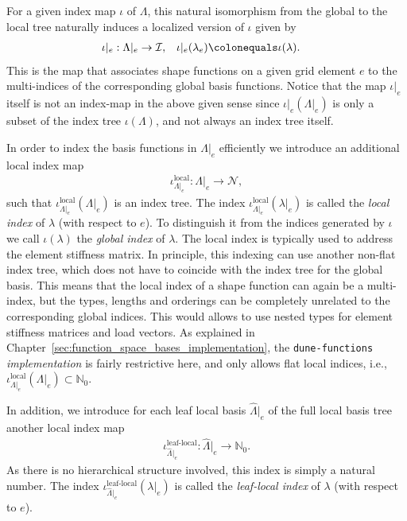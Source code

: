 \documentclass[a4paper,10pt,headings=normal,bibliography=totoc]{scrartcl}
\newcommand{\dunemodule}[1]{\texttt{#1}}
\begin{document}
For a given index map $\iota$ of $\Lambda$,
this natural isomorphism from the global to the local tree
naturally induces a localized version of $\iota$ given by
\begin{align*}
  \iota|_e : \Lambda|_e &\to \mathcal{I}, &
  \iota|_e(\lambda_e) &\colonequals \iota(\lambda).
\end{align*}
This is the map that associates shape functions on a given grid element $e$ to
the multi-indices of the corresponding global basis functions.
Notice that the map $\iota|_e$ itself is not an index-map in the above given sense
since $\iota|_e(\Lambda|_e)$ is only a subset of the index tree $\iota(\Lambda)$,
and not always an index tree itself.

In order to index the basis functions in $\Lambda|_e$ efficiently we introduce
an additional local index map
\begin{align*}
  \iota^{\text{local}}_{\Lambda|_e}: \Lambda|_e \to \mathcal{N},
\end{align*}
such that $\iota^{\text{local}}_{\Lambda|_e}(\Lambda|_e)$ is an index tree.
The index $\iota^{\text{local}}_{\Lambda|_e}(\lambda|_e)$ is
called the \emph{local index} of $\lambda$ (with respect to $e$).
To distinguish it from the indices generated by $\iota$
we call $\iota(\lambda)$ the \emph{global index} of $\lambda$.
The local index is typically used to address the element stiffness matrix.
In principle, this indexing can use another non-flat index tree,
which does not have to coincide with the index tree for the global basis.
This means that the local index of a shape function can again be a multi-index, but the types,
lengths and orderings can be completely unrelated to the corresponding global indices.
This would allows to use nested types for element stiffness matrices and load vectors.
As explained in Chapter~\ref{sec:function_space_bases_implementation},
the \dunemodule{dune-functions} \emph{implementation} is fairly restrictive here,
and only allows flat local indices, i.e.,
$\iota^{\text{local}}_{\Lambda|_e}(\Lambda|_e) \subset \mathbb{N}_0.$

In addition, we introduce for each leaf local basis $\hat{\Lambda}|_e$
of the full local basis tree another local index map
\begin{align*}
  \iota^{\text{leaf-local}}_{\hat{\Lambda}|_e}: \hat{\Lambda}|_e \to \mathbb{N}_0.
\end{align*}
As there is no hierarchical structure involved, this index is simply a
natural number.
The index $\iota^{\text{leaf-local}}_{\hat{\Lambda}|_e}(\lambda|_e)$ is
called the \emph{leaf-local index} of $\lambda$ (with respect to $e$).
\end{document}
